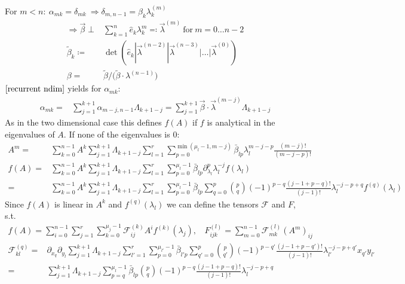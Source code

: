 \documentclass[12pt]{article}
\newcommand{\del}{\partial}
\begin{document}
For $m<n:\ \alpha_{mk} = \delta_{mk}\ \Rightarrow \delta_{m,n-1} = \beta_k \lambda_k^{(m)}$
\begin{align}
\Rightarrow \vec \beta \perp& \sum_{k=1}^n \hat e_k \lambda_k^m \eqqcolon \vec \lambda^{(m)} \ \text{for}\ m=0\dots n-2 \nonumber\\
\tilde\beta_k \coloneqq& \det(\hat e_k | \vec\lambda^{(n-2)} | \vec\lambda^{(n-3)} | \dots | \vec\lambda^{(0)})\nonumber\\
\beta =& \tilde\beta /\big( \tilde \beta \cdot \lambda^{(n-1)} \big)
\end{align}
$\eqref{recurrent ndim}$ yields for $\alpha_{mk}$:
\begin{align}
\alpha_{mk} =& \sum_{j=1}^{k+1} \alpha_{m-j,n-1} \Lambda_{k+1-j} = \sum_{j=1}^{k+1} \vec\beta\cdot\vec\lambda^{(m-j)} \Lambda_{k+1-j}
\end{align}
As in the two dimensional case this defines $f(A)$ if $f$ is analytical in the eigenvalues of $A$. If none of the eigenvalues is $0$:
\begin{align}
A^m =& \sum_{k=0}^{n-1} A^k \sum_{j=1}^{k+1} \Lambda_{k+1-j} \sum_{l=1}^r \sum_{p=0}^{\min(\mu_l-1,m-j)} \bar\beta_{lp} \lambda_l^{m-j-p} \frac{(m-j)!}{(m-j-p)!}\\
f(A) =& \sum_{k=0}^{n-1} A^k \sum_{j=1}^{k+1} \Lambda_{k+1-j} \sum_{l=1}^r \sum_{p=0}^{\mu_l-1} \bar\beta_{lp} \del_{\lambda_l}^p \lambda_l^{-j} f(\lambda_l) \nonumber\\
=& \sum_{k=0}^{n-1} A^k \sum_{j=1}^{k+1} \Lambda_{k+1-j} \sum_{l=1}^r \sum_{p=0}^{\mu_l-1} \bar\beta_{lp} \sum_{q=0}^p \binom pq (-1)^{p-q}\frac{(j-1+p-q)!}{(j-1)!} \lambda_l^{-j-p+q} f^{(q)}(\lambda_l)
\end{align}
Since $f(A)$ is linear in $A^k$ and $f^{(q)}(\lambda_l)$ we can define the tensors $\mathcal F$ and $F$, s.t.
\begin{align}
f(A) = \sum_{i=0}^{n-1} \sum_{j=1}^r \sum_{k=0}^{\mu_j-1} \mathcal F_{ij}^{(k)} A^i f^{(k)}(\lambda_j),\ \ \ \ F_{ijk}^{(l)} = \sum_{m=0}^{n-1} \mathcal F_{mk}^{(l)} (A^m)_{ij}
\end{align}
\begin{align}
\mathcal F_{kl}^{(q)} =& \del_{x_q} \del_{y_l} \sum_{j=1}^{k+1} \Lambda_{k+1-j} \sum_{l'=1}^r \sum_{p=0}^{\mu_{l'}-1} \bar\beta_{l'p} \sum_{q'=0}^p \binom p{q'} (-1)^{p-q'}\frac{(j-1+p-q')!}{(j-1)!} \lambda_{l'}^{-j-p+q'} x_{q'} y_{l'} \nonumber\\
=& \sum_{j=1}^{k+1} \Lambda_{k+1-j} \sum_{p=q}^{\mu_l-1} \bar\beta_{lp} \binom pq (-1)^{p-q}\frac{(j-1+p-q)!}{(j-1)!} \lambda_l^{-j-p+q}
\end{align}
\end{document}
